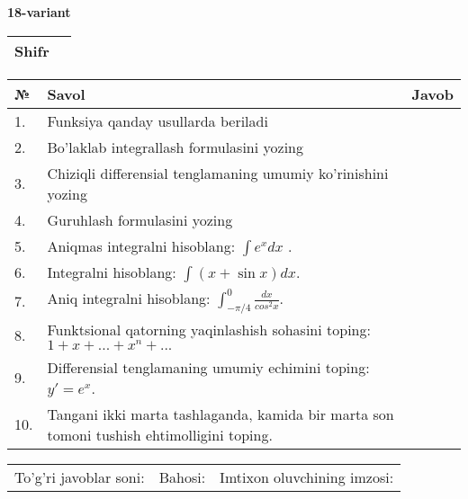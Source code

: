 \documentclass{article}
\begin{document}
  \egroup
  
  \newpage
  
  
  \textbf{18-variant}\\
  
  \bgroup
  \def\arraystretch{1.6} %
  
  \begin{tabular}{|m{5.7cm}|m{9.5cm}|}
  \hline
  Shifr & \\
  \hline
  \end{tabular}
  
  \vspace{1cm}
  
  \begin{tabular}{|m{0.7cm}|m{10cm}|m{4cm}|}
  \hline
  № & Savol & Javob \\
  \hline
  1. & Funksiya qanday usullarda beriladi &  \\
  \hline
  2. & Bo'laklab integrallash formulasini yozing &  \\
  \hline
  3. & Chiziqli differensial tenglamaning umumiy ko'rinishini yozing &  \\
  \hline
  4. & Guruhlash formulasini yozing &  \\
  \hline
  5. & Aniqmas integralni hisoblang: \(\int {e^{x}dx}\) . &  \\
  \hline
  6. & Integralni hisoblang: \(\int {(x + \sin x)dx}\). &  \\
  \hline
  7. & Aniq integralni hisoblang: \(\int_{- \pi/4}^{0}\frac{dx}{cos^{2}x}\). &  \\
  \hline
  8. & Funktsional qatorning yaqinlashish sohasini toping:\(1 + x + ... + x^{n} + ...\) &  \\
  \hline
  9. & Differensial tenglamaning umumiy echimini toping: \(y' = e^{x}\). &  \\
  \hline
  10. & Tangani ikki marta tashlaganda, kamida bir marta son tomoni tushish ehtimolligini toping. &  \\
  \hline
  \end{tabular}
  
  \vspace{1cm}
  
  \begin{tabular}{lll}
  To'g'ri javoblar soni: \underline{\hspace{1.5cm}} & 
  Bahosi: \underline{\hspace{1.5cm}} & 
  Imtixon oluvchining imzosi: \underline{\hspace{2cm}} \\
  \end{tabular}
  
\end{document}

